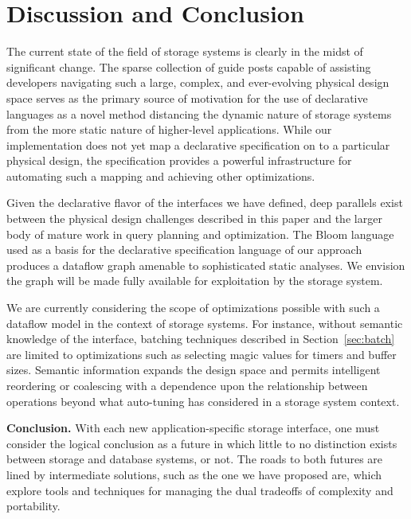 \section{Discussion and Conclusion}
\label{sec:opts}

The current state of the field of storage systems is clearly in the midst of significant
change. The sparse collection of guide posts capable of assisting developers navigating such a
large, complex, and ever-evolving physical design space serves as the primary source of 
motivation for the use of declarative languages as a novel method distancing 
the dynamic nature of storage systems from the more static nature of higher-level
applications. While our implementation does not yet map a declarative specification 
on to a particular physical design, the specification provides a powerful infrastructure for
automating such a mapping and achieving other optimizations.

Given the declarative flavor of the interfaces we have defined, 
deep parallels exist between the physical design challenges described in this paper and
the larger body of mature work in query planning and optimization. The Bloom
language used as a basis for the declarative specification language of our approach
produces a dataflow graph amenable to sophisticated static analyses. We
envision the graph will be made fully available for exploitation by the storage system.

We are currently considering the scope of optimizations possible with
such a dataflow model in the context of storage systems. For instance, without
semantic knowledge of the interface, batching techniques described in
Section~\ref{sec:batch} are limited to optimizations such as selecting magic
values for timers and buffer sizes. Semantic information expands the design
space and permits intelligent reordering or coalescing with a dependence upon the
relationship between operations beyond what auto-tuning has considered in a storage system context.

{\bf Conclusion.} With each new application-specific storage interface, one
must consider the logical conclusion as a future in which little to no
distinction exists between storage and database systems, or not. The roads to both futures
are lined by intermediate solutions, such as the one we have proposed are, which 
explore tools and techniques for managing the dual tradeoffs of complexity and portability.

